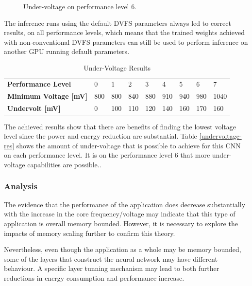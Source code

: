 \begin{figure}[!htb]
\begin{minipage}{.49\textwidth}
    \end{minipage}
    \caption{Under-voltage on performance level 6.}
    \label{fig:under6}
\end{figure}

The inference runs using the default DVFS parameters always led to correct results, on all performance levels, which means that the trained weights achieved with non-conventional DVFS parameters can still be used to perform inference on another GPU running default parameters.

\begin{table}[!htb]
\centering
\begin{tabular}{l|llllllll}
\textbf{Performance Level}  & 0   & 1   & 2   & 3   & 4   & 5   & 6   & 7    \\
\textbf{Minimum Voltage [mV]}    & 800 & 800 & 840 & 880 & 910 & 940 & 980 & 1040 \\
\textbf{Undervolt {[}mV{]}} & 0   & 100 & 110 & 120 & 140 & 160 & 170 & 160 
\end{tabular}
\caption{Under-Voltage Results}
\label{tab:undervoltage-res}
\end{table}

The achieved results show that there are benefits of finding the lowest voltage level since the power and energy reduction are substantial. Table \ref{undervoltage-res} shows the amount of under-voltage that is possible to achieve for this CNN on each performance level. It is on the performance level 6 that more under-voltage capabilities are possible..



\subsubsection{Analysis}
The evidence that the performance of the application does decrease substantially with the increase in the core frequency/voltage may indicate that this type of application is overall memory bounded. However, it is necessary to explore the impacts of memory scaling further to confirm this theory. 

Nevertheless, even though the application as a whole may be memory bounded, some of the layers that construct the neural network may have different behaviour. A specific layer tunning mechanism may lead to both further reductions in energy consumption and performance increase.
